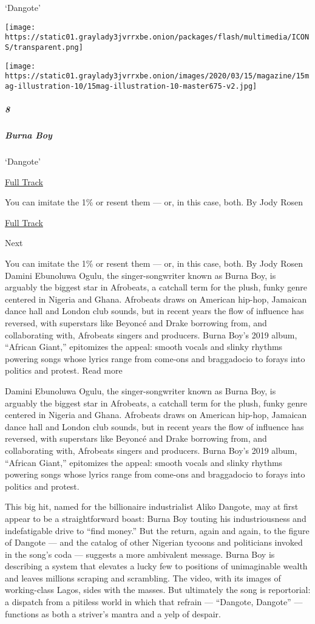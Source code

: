 `Dangote'

\texttt{[image: https://static01.graylady3jvrrxbe.onion/packages/flash/multimedia/ICONS/transparent.png]}

\texttt{[image: https://static01.graylady3jvrrxbe.onion/images/2020/03/15/magazine/15mag-illustration-10/15mag-illustration-10-master675-v2.jpg]}

\hypertarget{8}{%
\subparagraph{8}\label{8}}

\hypertarget{burna-boy}{%
\subparagraph{Burna Boy}\label{burna-boy}}

`Dangote'

\href{https://open.spotify.com/track/07XZZTucIfMyOSnkF0GPWJ?si=8pXt430uSiuCk1Drjl8eGQ}{
Full Track}

You can imitate the 1\% or resent them --- or, in this case, both. By
Jody Rosen

\href{https://open.spotify.com/track/07XZZTucIfMyOSnkF0GPWJ?si=8pXt430uSiuCk1Drjl8eGQ}{Full
Track }

Next

You can imitate the 1\% or resent them --- or, in this case, both. By
Jody Rosen Damini Ebunoluwa Ogulu, the singer-songwriter known as Burna
Boy, is arguably the biggest star in Afrobeats, a catchall term for the
plush, funky genre centered in Nigeria and Ghana. Afrobeats draws on
American hip-hop, Jamaican dance hall and London club sounds, but in
recent years the flow of influence has reversed, with superstars like
Beyoncé and Drake borrowing from, and collaborating with, Afrobeats
singers and producers. Burna Boy's 2019 album, ``African Giant,''
epitomizes the appeal: smooth vocals and slinky rhythms powering songs
whose lyrics range from come-ons and braggadocio to forays into politics
and protest. Read more

Damini Ebunoluwa Ogulu, the singer-songwriter known as Burna Boy, is
arguably the biggest star in Afrobeats, a catchall term for the plush,
funky genre centered in Nigeria and Ghana. Afrobeats draws on American
hip-hop, Jamaican dance hall and London club sounds, but in recent years
the flow of influence has reversed, with superstars like Beyoncé and
Drake borrowing from, and collaborating with, Afrobeats singers and
producers. Burna Boy's 2019 album, ``African Giant,'' epitomizes the
appeal: smooth vocals and slinky rhythms powering songs whose lyrics
range from come-ons and braggadocio to forays into politics and protest.

This big hit, named for the billionaire industrialist Aliko Dangote, may
at first appear to be a straightforward boast: Burna Boy touting his
industriousness and indefatigable drive to ``find money.'' But the
return, again and again, to the figure of Dangote --- and the catalog of
other Nigerian tycoons and politicians invoked in the song's coda ---
suggests a more ambivalent message. Burna Boy is describing a system
that elevates a lucky few to positions of unimaginable wealth and leaves
millions scraping and scrambling. The video, with its images of
working-class Lagos, sides with the masses. But ultimately the song is
reportorial: a dispatch from a pitiless world in which that refrain ---
``Dangote, Dangote'' --- functions as both a striver's mantra and a yelp
of despair.

